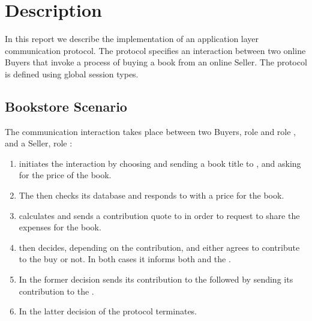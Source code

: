 \section{Description}

In this report we describe the implementation of
an application layer communication protocol.
The protocol specifies an interaction between
two online Buyers that invoke a process of
buying a book from an online Seller.
The protocol is defined using global session types.

\subsection{Bookstore Scenario}
\label{subsec:description}

The communication interaction takes place between two Buyers,
role \BuyerOne and role \BuyerTwo, and a Seller,
role \Seller:
\begin{enumerate}
	\item
			\BuyerOne initiates the interaction
			by choosing and sending a book title to \Seller,
			and asking for the price of the book.

	\item
			The \Seller then checks its database and
			responds to \BuyerOne with a price for the book.

	\item
			\BuyerOne calculates and
			sends a contribution quote to
			\BuyerTwo in order to request to
			share the expenses for the book.

	\item
			\BuyerTwo then decides, depending on
			the contribution, and
			either agrees to contribute
			to the buy or not. In both
			cases it informs both \BuyerOne
			and the \Seller.

	\item
			In the former decision \BuyerOne
			sends its contribution to the \Seller
			followed by \BuyerTwo sending its
			contribution to the \Seller.

	\item
			In the latter decision of \BuyerTwo
			the protocol terminates.
\end{enumerate}
			

